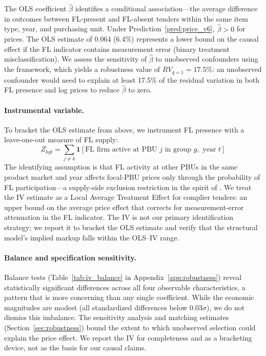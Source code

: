 The OLS coefficient $\hat{\beta}$ identifies a conditional
association---the average difference in outcomes between FL-present and
FL-absent tenders within the same item type, year, and purchasing unit.
Under Prediction~\ref{pred:price_v6}, $\hat{\beta} > 0$ for prices. The
OLS estimate of 0.064 (6.4\%) represents a lower bound on the causal
effect if the FL indicator contains measurement error (binary treatment
misclassification). We assess the sensitivity of $\hat{\beta}$ to
unobserved confounders using the \citet{cinelli2020making} framework,
which yields a robustness value of $RV_{q=1} = 17.5\%$: an unobserved
confounder would need to explain at least 17.5\% of the residual
variation in both FL presence and log prices to reduce $\hat{\beta}$ to
zero.

\paragraph{Instrumental variable.}
To bracket the OLS estimate from above, we instrument FL presence with %
a leave-one-out measure of FL supply:
\begin{equation}
  Z_{kgt} = \sum_{j \neq k} \mathbf{1}[\text{FL firm active at PBU } j
  \text{ in group } g, \text{ year } t]
  \label{eq:iv_v6}
\end{equation}
The identifying assumption is that FL activity at other PBUs in the same
product market and year affects focal-PBU prices only through the
probability of FL participation---a supply-side exclusion restriction in
the spirit of \citet{goldsmithpinkham2020bartik}. We treat the IV
estimate as a Local Average Treatment Effect for complier tenders: an
upper bound on the average price effect that corrects for
measurement-error attenuation in the FL indicator. The IV is not our
primary identification strategy; we report it to bracket the OLS
estimate and verify that the structural model's implied markup falls
within the OLS--IV range.

\paragraph{Balance and specification sensitivity.}
Balance tests (Table~\ref{tab:iv_balance} in
Appendix~\ref{app:robustness}) reveal statistically significant
differences across all four observable characteristics, a pattern that
is more concerning than any single coefficient. While the economic
magnitudes are modest (all standardized differences below
$0.03\sigma$), we do not dismiss this imbalance. The sensitivity
analysis and matching estimates
(Section~\ref{sec:robustness}) bound the extent to which unobserved
selection could explain the price effect. We report the IV for
completeness and as a bracketing device, not as the basis for our
causal claims.

